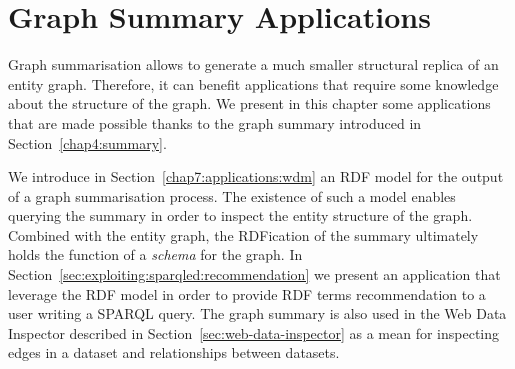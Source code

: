 \chapter{Graph Summary Applications}
\label{chap7:applications}

Graph summarisation allows to generate a much smaller structural replica of an entity graph. Therefore, it can benefit applications that require some knowledge about the structure of the graph. We present in this chapter some applications that are made possible thanks to the graph summary introduced in Section~\ref{chap4:summary}.

We introduce in Section~\ref{chap7:applications:wdm} an RDF model for the output of a graph summarisation process. The existence of such a model enables querying the summary in order to inspect the entity structure of the graph. Combined with the entity graph, the RDFication of the summary ultimately holds the function of a \emph{schema} for the graph. In Section~\ref{sec:exploiting:sparqled:recommendation} we present an application that leverage the RDF model in order to provide RDF terms recommendation to a user writing a SPARQL query. The graph summary is also used in the Web Data Inspector described in Section~\ref{sec:web-data-inspector} as a mean for inspecting edges in a dataset and relationships between datasets.
